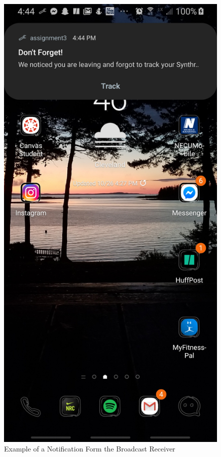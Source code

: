 \documentclass{article}
\begin{document}
\begin{figure}[H]
\centering
\includegraphics[scale= .1]{img/notification.jpg}
\caption{Example of a Notification Form the Broadcast Receiver}
\label{fig:notification} 
\end{figure}
\end{document}
